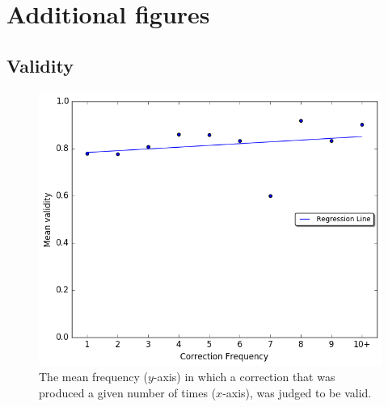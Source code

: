 \documentclass[letterpaper, 11pt]{article}
\begin{document}
\section{Additional figures}
\subsection{Validity}\label{ap:validity_judgements}
\begin{figure}[h!]
	\vspace{-.3cm}
	\includegraphics[width=0.9\columnwidth]{IAA_confirmation_frequency}
	\caption{The mean frequency ($y$-axis) in which a correction that was produced
		a given number of times ($x$-axis), was judged to be valid.
		 \label{fig:validity_judgements}}
		\vspace{-0.3cm}
		\end{figure}
\end{document}
